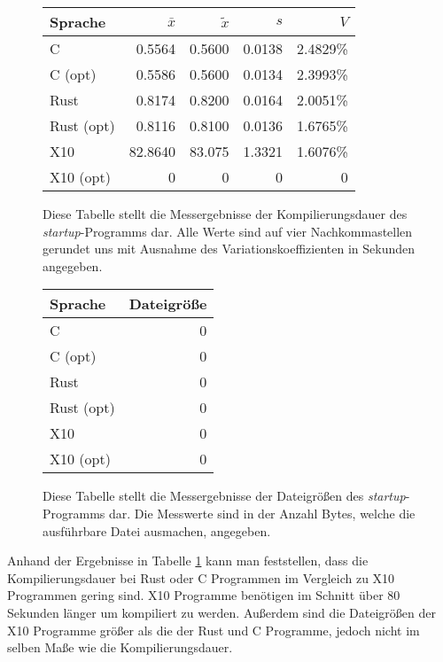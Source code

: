 \begin{figure}[hb]
	\begin{center}
		\begin{tabular}{lrrrr}
			\toprule
			Sprache    & $\bar{x}$ & $\tilde{x}$ & $s$ & $V$\\
			\midrule
			C          &  0.5564 & 0.5600 & 0.0138 & 2.4829\% \\
			C (opt)    &  0.5586 & 0.5600 & 0.0134 & 2.3993\% \\
			Rust       &  0.8174 & 0.8200 & 0.0164 & 2.0051\% \\
			Rust (opt) &  0.8116 & 0.8100 & 0.0136 & 1.6765\% \\
			X10        & 82.8640 & 83.075 & 1.3321 & 1.6076\% \\
			X10 (opt)  &  0      & 0      & 0      & 0        \\
			\bottomrule
		\end{tabular}
	\end{center}
	\caption{
		Diese Tabelle stellt die Messergebnisse der Kompilierungsdauer des \textit{startup}-Programms dar.
		Alle Werte sind auf vier Nachkommastellen gerundet uns mit Ausnahme des Variationskoeffizienten
		in Sekunden angegeben.
	}
	\label{fig:compile_table}
\end{figure}

\begin{figure}[hb]
	\begin{center}
		\begin{tabular}{lr}
			\toprule
			Sprache & Dateigröße \\
			\midrule
			C          & 0 \\
			C (opt)    & 0 \\
			Rust       & 0 \\
			Rust (opt) & 0 \\
			X10        & 0 \\
			X10 (opt)  & 0 \\
			\bottomrule
		\end{tabular}
	\end{center}
	\caption{
		Diese Tabelle stellt die Messergebnisse der Dateigrößen des \textit{startup}-Programms dar.
		Die Messwerte sind in der Anzahl Bytes, welche die ausführbare Datei ausmachen, angegeben.
	}
	\label{fig:filesize_table}
\end{figure}

Anhand der Ergebnisse in Tabelle \ref{fig:compile_table} kann man feststellen,
dass die Kompilierungsdauer bei Rust oder C Programmen im Vergleich zu
X10 Programmen gering sind. X10 Programme benötigen im Schnitt über 80 Sekunden länger um kompiliert zu werden.
Außerdem sind die Dateigrößen der X10 Programme größer als die der Rust und C Programme,
jedoch nicht im selben Maße wie die Kompilierungsdauer.

